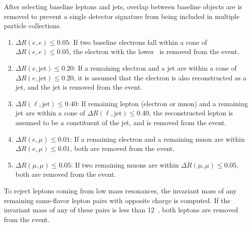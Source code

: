 \begin{table}[ht]
    \caption{Baseline jet requirements.}
    \label{tab:baseline_jet_def}
\end{table}

After selecting baseline leptons and jets, overlap between baseline objects are
is removed to prevent a single detector signature from being included in
multiple particle collections. 

\begin{enumerate}
  \item $\Delta R(e,e) \le 0.05$: If two baseline electrons fall
    within a cone of $\Delta R(e,e) \le 0.05$, the electron with the
    lower \ET\ is removed from the event.
  \item $\Delta R(e,\mathrm{jet}) \le 0.20$: If a remaining electron and a jet
    are within a cone of $\Delta R(e,\mathrm{jet}) \le 0.20$, it is
    assumed that the electron is also reconstructed as a jet, and the
    jet is removed from the event.
  \item $\Delta R(\ell,\mathrm{jet}) \le 0.40$: If remaining lepton (electron
    or muon) and a remaining jet are within a cone of
    $\Delta R(\ell,\mathrm{jet}) \le 0.40$, the reconstructed lepton is assumed
    to be a constituent of the jet, and is removed from the event.
  \item $\Delta R(e,\mu) \le 0.01$: If a remaining electron and a remaining muon
    are within $\Delta R(e,\mu) \le 0.01$, both are removed from the event.
  \item $\Delta R(\mu,\mu) \le 0.05$: If two remaining muons are within
    $\Delta R(\mu,\mu) \le 0.05$, both are removed from the event.
\end{enumerate}

To reject leptons coming from low mass resonances, the invariant mass of any
remaining same-flavor lepton pairs with opposite charge is computed.
If the invariant mass of any of these pairs is less than 12~\GeV, both leptons
are removed from the event.

